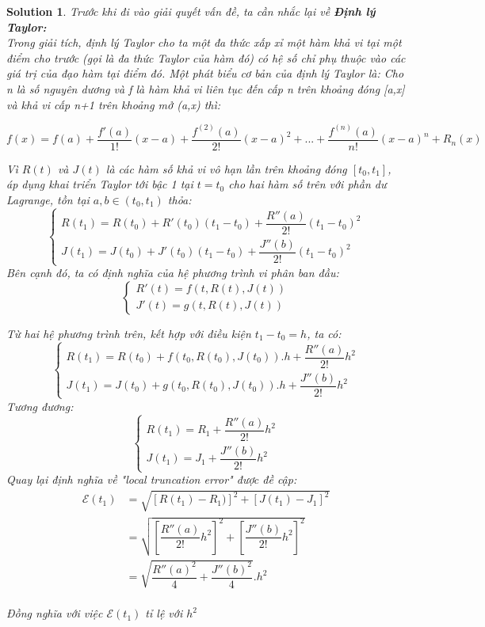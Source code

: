 \documentclass[a4paper]{article}
\newtheorem*{sol}{Solution}
\begin{document}
\begin{sol}
Trước khi đi vào giải quyết vấn đề, ta cần nhắc lại về \textbf{\textit{Định lý Taylor:}} \\
Trong giải tích, định lý Taylor cho ta một đa thức xấp xỉ một hàm khả vi tại một điểm cho trước (gọi là đa thức Taylor của hàm đó) có hệ số chỉ phụ thuộc vào các giá trị của đạo hàm tại điểm đó. Một phát biểu cơ bản của định lý Taylor là: 
Cho n là số nguyên dương và f là hàm khả vi liên tục đến cấp n trên khoảng đóng [a,x] và khả vi cấp n+1 trên khoảng mở (a,x) thì: \\
\begin{center}
    \begin{math}
    f(x) = f(a) + \dfrac{f'(a)}{1!}(x-a) + \dfrac{f^{(2)}(a)}{2!}(x-a)^{2} +...+ \dfrac{f^{(n)}(a)}{n!}(x-a)^{n} + R_{n}(x) 
\end{math} \\
\end{center}

Vì $R(t)$ và $J(t)$ là các hàm số khả vi vô hạn lần trên khoảng đóng $[t_0, t_1]$, áp dụng khai triển Taylor tới bậc 1 tại $t = t_0$ cho hai hàm số trên với phần dư Lagrange, tồn tại $a, b \in (t_0, t_1)$ thỏa: \\
$$ \begin{cases}
    R(t_1) = R(t_0) + R'(t_0)(t_1 - t_0) + \dfrac{R''(a)}{2!}(t_1 - t_0)^{2} \\ 
    J(t_1) = J(t_0) + J'(t_0)(t_1 - t_0) + \dfrac{J''(b)}{2!}(t_1 - t_0)^{2}
\end{cases}$$
Bên cạnh đó, ta có định nghĩa của hệ phương trình vi phân ban đầu: 
$$\begin{cases}
    R'(t) = f(t, R(t), J(t)) \\
    J'(t) = g(t, R(t), J(t))
\end{cases} $$

Từ hai hệ phương trình trên, kết hợp với điều kiện $t_1 - t_0 = h$, ta có: \\
$$\begin{cases}
    R(t_1) = R(t_0) + f(t_0, R(t_0), J(t_0)).h + \dfrac{R''(a)}{2!}h^{2} \\
    J(t_1) = J(t_0) + g(t_0, R(t_0), J(t_0)).h + \dfrac{J''(b)}{2!}h^2 
\end{cases} $$
Tương đương: 
$$\begin{cases}
    R(t_1) = R_1 + \dfrac{R''(a)}{2!}h^{2} \\
    J(t_1) = J_1 + \dfrac{J''(b)}{2!}h^{2}
\end{cases}$$
Quay lại định nghĩa về "local truncation error" được đề cập: 
\begin{equation} 
\begin{split}
\mathcal{E}(t_1) 
&     = \sqrt{[R(t_1) - R_1)]^{2} + [J(t_1) - J_1]^{2}} \\
&   = \sqrt{[\dfrac{R''(a)}{2!}h^{2}]^{2} + [\dfrac{J''(b)}{2!}h^{2}]^{2}} \\
&   = \sqrt{\dfrac{R''(a)^2}{4} + \dfrac{J''(b)^2}{4}} .h^{2}
\end{split}
\end{equation} \\

Đồng nghĩa với việc $\mathcal{E}(t_1)$ tỉ lệ với $h^{2}$

\end{sol}
\end{document}

